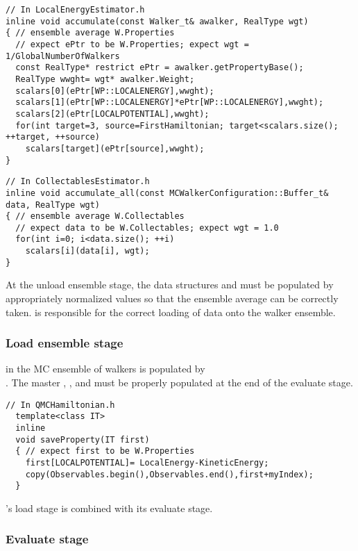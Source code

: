 \begin{lstlisting}
// In LocalEnergyEstimator.h
inline void accumulate(const Walker_t& awalker, RealType wgt)
{ // ensemble average W.Properties
  // expect ePtr to be W.Properties; expect wgt = 1/GlobalNumberOfWalkers
  const RealType* restrict ePtr = awalker.getPropertyBase();
  RealType wwght= wgt* awalker.Weight;
  scalars[0](ePtr[WP::LOCALENERGY],wwght);
  scalars[1](ePtr[WP::LOCALENERGY]*ePtr[WP::LOCALENERGY],wwght);
  scalars[2](ePtr[LOCALPOTENTIAL],wwght);
  for(int target=3, source=FirstHamiltonian; target<scalars.size(); ++target, ++source)
    scalars[target](ePtr[source],wwght);
}
\end{lstlisting}

\begin{lstlisting}
// In CollectablesEstimator.h
inline void accumulate_all(const MCWalkerConfiguration::Buffer_t& data, RealType wgt)
{ // ensemble average W.Collectables
  // expect data to be W.Collectables; expect wgt = 1.0
  for(int i=0; i<data.size(); ++i)
    scalars[i](data[i], wgt);
}
\end{lstlisting}

At the unload ensemble stage, the data structures  and  must be populated by appropriately normalized values so that the ensemble average can be correctly taken.  is responsible for the correct loading of data onto the walker ensemble.

\subsubsection{Load ensemble stage}
 in the MC ensemble of walkers  is populated by \\ . The master , , and  must be properly populated at the end of the evaluate stage.
\begin{lstlisting}
// In QMCHamiltonian.h
  template<class IT>
  inline
  void saveProperty(IT first)
  { // expect first to be W.Properties
    first[LOCALPOTENTIAL]= LocalEnergy-KineticEnergy;
    copy(Observables.begin(),Observables.end(),first+myIndex);
  }
\end{lstlisting}

's load stage is combined with its evaluate stage.

\subsubsection{Evaluate stage}

